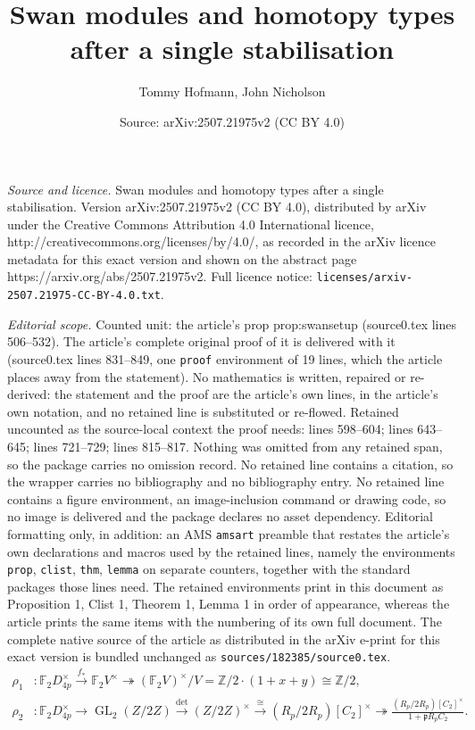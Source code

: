 \documentclass[10pt,a4paper]{amsart}
\title{Swan modules and homotopy types after a single stabilisation}
\author{Tommy Hofmann, John Nicholson}
\date{Source: arXiv:2507.21975v2 (CC BY 4.0)}
\newcommand{\F}{\mathbb{F}}
\DeclareMathOperator{\GL}{GL}
\newcommand{\Z}{\mathbb{Z}}
\begin{document}
\maketitle

\noindent\emph{Source and licence.} Swan modules and homotopy types after a single stabilisation. Version arXiv:2507.21975v2 (CC BY 4.0), distributed by arXiv under the Creative Commons Attribution 4.0 International licence, http://creativecommons.org/licenses/by/4.0/, as recorded in the arXiv licence metadata for this exact version and shown on the abstract page https://arxiv.org/abs/2507.21975v2. Full licence notice: \texttt{licenses/arxiv-2507.21975-CC-BY-4.0.txt}.\par\smallskip

\noindent\textit{Editorial scope.} Counted unit: the article's prop prop:swansetup (source0.tex lines 506--532). The article's complete original proof of it is delivered with it (source0.tex lines 831--849, one \texttt{proof} environment of 19 lines, which the article places away from the statement). No mathematics is written, repaired or re-derived: the statement and the proof are the article's own lines, in the article's own notation, and no retained line is substituted or re-flowed.  Retained uncounted as the source-local context the proof needs: lines 598--604; lines 643--645; lines 721--729; lines 815--817.  Nothing was omitted from any retained span, so the package carries no omission record.  No retained line contains a citation, so the wrapper carries no bibliography and no bibliography entry.  No retained line contains a figure environment, an image-inclusion command or drawing code, so no image is delivered and the package declares no asset dependency.  Editorial formatting only, in addition: an AMS \texttt{amsart} preamble that restates the article's own declarations and macros used by the retained lines, namely the environments \texttt{prop}, \texttt{clist}, \texttt{thm}, \texttt{lemma} on separate counters, together with the standard packages those lines need.  The retained environments print in this document as Proposition 1, Clist 1, Theorem 1, Lemma 1 in order of appearance, whereas the article prints the same items with the numbering of its own full document.  The complete native source of the article as distributed in the arXiv e-print for this exact version is bundled unchanged as \texttt{sources/182385/source0.tex}.
\begin{equation}\label{eq:rhos}
\begin{aligned}
\rho_1 &: \F_2 D_{4p}^\times \xrightarrow[]{f_*} \F_2 V^\times \twoheadrightarrow {(\F_2 V)^\times}/V = \Z/2 \cdot (1+x+y) \cong \Z /2 ,
\\
\rho_2 &: \F_2 D_{4p}^\times \to \GL_2(Z/2Z) \xrightarrow[]{\det} (Z/2Z)^\times \xrightarrow[]{\cong} (R_p/2R_p)[C_2]^\times  \twoheadrightarrow \frac{(R_p/2R_p)[C_2]^\times}{1+\mathfrak{p}R_pC_2}.
\end{aligned} 
\end{equation}
\end{document}
